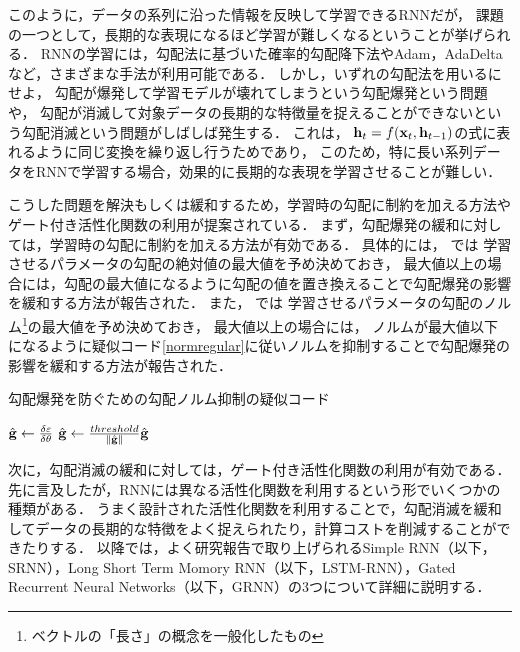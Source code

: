 このように，データの系列に沿った情報を反映して学習できるRNNだが，
課題の一つとして，長期的な表現になるほど学習が難しくなるということが挙げられる\cite{bengio1994learning}．
RNNの学習には，勾配法に基づいた確率的勾配降下法\cite{robbins1951stochastic,kushner2003stochastic}やAdam\cite{kingma2014adam}，AdaDelta\cite{zeiler2012adadelta}など，さまざまな手法が利用可能である．
しかし，いずれの勾配法を用いるにせよ，
勾配が爆発して学習モデルが壊れてしまうという勾配爆発\cite{bengio1994learning,pascanu2013difficulty}という問題や，
勾配が消滅して対象データの長期的な特徴量を捉えることができないという勾配消滅\cite{pascanu2013difficulty, hochreiter1998vanishing}という問題がしばしば発生する．
これは，
${\bf h}_t = f({\bf x}_t, {\bf h}_{t-1})$の式に表れるように同じ変換を繰り返し行うためであり，
このため，特に長い系列データをRNNで学習する場合，効果的に長期的な表現を学習させることが難しい．


こうした問題を解決もしくは緩和するため，学習時の勾配に制約を加える方法やゲート付き活性化関数の利用が提案されている．
まず，勾配爆発の緩和に対しては，学習時の勾配に制約を加える方法が有効である．
具体的には，
\cite{mikolov2012statistical}では
学習させるパラメータの勾配の絶対値の最大値を予め決めておき，
最大値以上の場合には，勾配の最大値になるように勾配の値を置き換えることで勾配爆発の影響を緩和する方法が報告された．
また，
\cite{pascanu2013difficulty}では
学習させるパラメータの勾配のノルム\footnote{ベクトルの「長さ」の概念を一般化したもの}の最大値を予め決めておき，
最大値以上の場合には， ノルムが最大値以下になるように疑似コード\ref{normregular}に従いノルムを抑制することで勾配爆発の影響を緩和する方法が報告された．
\begin{algorithm}                      
\caption{勾配爆発を防ぐための勾配ノルム抑制の疑似コード}
\label{normregular}                          
\begin{algorithmic}                  
	\STATE $\hat{{\bf g}} \leftarrow \frac{\delta \varepsilon}{\delta {\bf \theta}}$
	\STATE $\hat{{\bf g}} \leftarrow \frac{threshold}{\Vert \hat{{\bf g}} \Vert} \hat{{\bf g}}$
	\ENDIF
\end{algorithmic}
\end{algorithm}


次に，勾配消滅の緩和に対しては，ゲート付き活性化関数の利用が有効である．
先に言及したが，RNNには異なる活性化関数を利用するという形でいくつかの種類がある．
うまく設計された活性化関数を利用することで，勾配消滅を緩和してデータの長期的な特徴をよく捉えられたり，計算コストを削減することができたりする．
以降では，よく研究報告で取り上げられるSimple RNN（以下，SRNN）\cite{williams1989learning}，Long Short  Term Momory RNN（以下，LSTM-RNN）\cite{hochreiter1997long}，Gated Recurrent Neural Networks（以下，GRNN）\cite{cho2014learning}の3つについて詳細に説明する．



